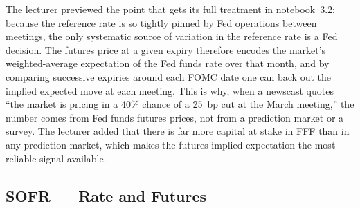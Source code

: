The lecturer previewed the point that gets its full treatment in
notebook~3.2: because the reference rate is so tightly pinned by Fed
operations between meetings, the only systematic source of variation in the
reference rate is a Fed decision. The futures price at a given expiry
therefore encodes the market's weighted-average expectation of the Fed
funds rate over that month, and by comparing successive expiries around
each FOMC date one can back out the implied expected move at each meeting.
This is why, when a newscast quotes ``the market is pricing in a 40\%
chance of a 25~bp cut at the March meeting,'' the number comes from Fed
funds futures prices, not from a prediction market or a survey. The
lecturer added that there is far more capital at stake in FFF than in any
prediction market, which makes the futures-implied expectation the most
reliable signal available.

\subsection{SOFR --- Rate and Futures}\label{L3-sec:stir-sofr}

